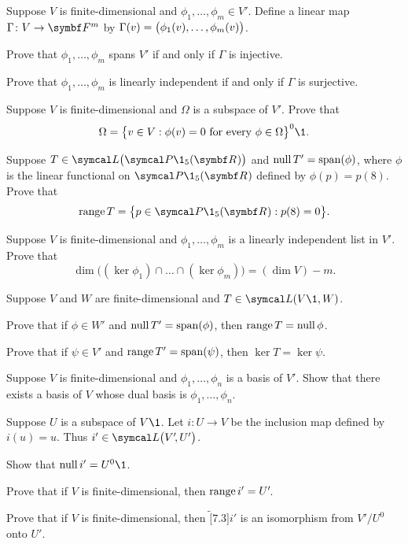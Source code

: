 \begin{exercises}
\exercise
Suppose $V$ is finite-dimensional and $\phi_1, \dots, \phi_m \in V'\!$. Define a linear map $\Gamma \colon V \to \F{m}$ by
$
\Gamma(v) = \paren[\big]{ \phi_1(v), \dots, \phi_m(v) }$.
\begin{subtheorem}
\item
Prove that $\phi_1, \dots, \phi_m$ spans $V'$ if and only if $\Gamma$ is injective.
\item
Prove that $\phi_1, \dots, \phi_m$ is linearly independent if and only if $\Gamma$ is surjective.
\end{subtheorem}
\exercisesubtheoremend


\exercise
Suppose $V$ is finite-dimensional and $\Omega$ is a subspace of $V'\!$. Prove that
\[
\Omega = \br[\big]{v \in V: \phi(v) = 0 \text{\ for every } \phi \in \Omega}^0\1.
\]
\exercisedisplayend


 \exercise
Suppose $T \in \L\bigl( \P\1_5(\R{}) \bigr)$ and $\ker T' = \Span(\phi)$, where $\phi$ is the linear functional on $\P\1_5(\R{})$ defined by $\phi(p) = p(8)$. Prove that
\[
\ran T = \br[\big]{ p \in \P\1_5(\R{}): p(8) = 0 }.
\]
\exercisedisplayend


\exercise
Suppose $V$ is finite-dimensional and $\phi_1, \dots, \phi_m$ is a linearly independent list in $V'\!$. Prove that \label{intker}
\[
\dim \bigl( (\ker \phi_1) \cap \dots \cap (\ker \phi_m)\bigr) = (\dim V) - m.
\]
\exercisedisplayend


\exercise
Suppose $V$ and $W$ are finite-dimensional and $T \in \L(V\1, W)$.
\begin{subtheorem}
\item
Prove that if $\phi \in W'$ and $\ker T' = \Span(\phi)$, then $\ran T = \ker \phi$.
\item
Prove that if $\psi \in V'$ and $\ran T' = \Span(\psi)$, then $\ker T = \ker \psi$.
\end{subtheorem}
\exercisesubtheoremend


\exercise
Suppose $V$ is finite-dimensional and $\phi_1, \dots, \phi_n$ is a basis of $V'\!$. Show that there exists a basis of $V$ whose dual basis is $\phi_1, \dots, \phi_n$.


\exercise
Suppose $U$ is a subspace of $V\1$. Let $i \colon U \to V$ be the inclusion map defined by $i(u) = u$. Thus
$i' \in \L\paren[\big]{V'\!, U'}$.
\begin{subtheorem}
\item
Show that $\ker i' = U^0\1$.
\item
Prove that if $V$ is finite-dimensional, then $\ran i' = U'\!$.
\item
Prove that if $V$ is finite-dimensional, then $\tilde[7.3]{i'}$ is an isomorphism from $V'\!/U^0$ onto $U'\!$.
\end{subtheorem}



\end{exercises}
